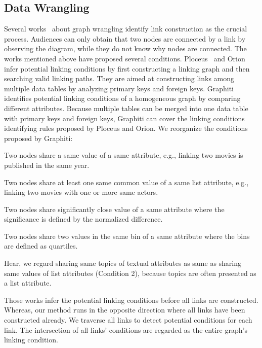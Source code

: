 \subsection{Data Wrangling}
Several works~\cite{DBLP:journals/ivs/LiuNS14, DBLP:journals/ivs/HeerP14, DBLP:journals/tvcg/SrinivasanPEB18} about graph wrangling identify link construction as the crucial process.
Audiences can only obtain that two nodes are connected by a link by observing the diagram, while they do not know why nodes are connected.
The works mentioned above have proposed several conditions.
Ploceus~\cite{DBLP:journals/ivs/LiuNS14} and Orion~\cite{DBLP:journals/ivs/HeerP14} infer potential linking conditions by first constructing a linking graph and then searching valid linking paths. They are aimed at constructing links among multiple data tables by analyzing primary keys and foreign keys.
Graphiti~\cite{DBLP:journals/tvcg/SrinivasanPEB18} identifies potential linking conditions of a homogeneous graph by comparing different attributes.
Because multiple tables can be merged into one data table with primary keys and foreign keys, Graphiti can cover the linking conditions identifying rules proposed by Ploceus and Orion. %
We reorganize the conditions proposed by Graphiti:
\begin{compactenum}
    \item Two nodes share a same value of a same attribute, e.g., linking two movies is published in the same year.
    \item Two nodes share at least one same common value of a same list attribute, e.g., linking two movies with one or more same actors.
    \item Two nodes share significantly close value of a same attribute where the significance is defined by the normalized difference.
    \item Two nodes share two values in the same bin of a same attribute where the bins are defined as quartiles.
\end{compactenum}
Hear, we regard sharing same topics of textual attributes as same as sharing same values of list attributes (Condition 2), because topics are often presented as a list attribute.

Those works infer the potential linking conditions before all links are constructed. 
Whereas, our method runs in the opposite direction where all links have been constructed already.
We traverse all links to detect potential conditions for each link.
The intersection of all links' conditions are regarded as the entire graph's linking condition.

